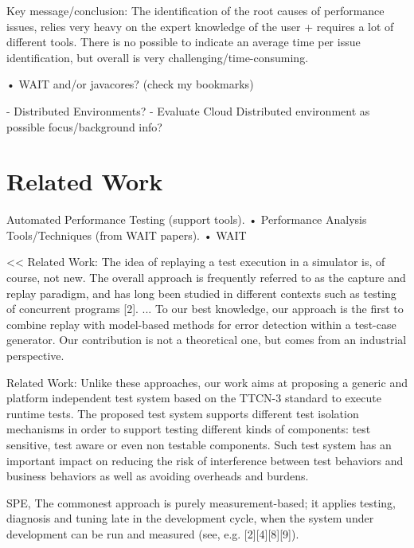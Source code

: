 \documentclass[runningheads,a4paper]{llncs}
\begin{document}
Key message/conclusion: The identification of the root causes of performance issues, relies very heavy on the expert knowledge of the user + requires a lot of different tools. There is no possible to indicate an average time per issue identification, but overall is very challenging/time-consuming.


•	WAIT and/or javacores? (check my bookmarks)

- Distributed Environments? - Evaluate Cloud Distributed environment as possible focus/background info?




\section{Related Work}

Automated Performance Testing (support tools).
•	Performance Analysis Tools/Techniques (from WAIT papers).
•	WAIT

<<
Related Work: The idea of replaying a test execution in a simulator is, of course, not new. The
overall approach is frequently referred to as the capture and replay paradigm,
and has long been studied in different contexts such as testing of concurrent
programs [2]. ... To our best knowledge, our approach is the first to combine replay with model-based
methods for error detection within a test-case generator. Our contribution is not
a theoretical one, but comes from an industrial perspective.

Related Work: Unlike these approaches, our work aims at proposing a generic and platform
independent test system based on the TTCN-3 standard to execute runtime
tests. The proposed test system supports different test isolation mechanisms in
order to support testing different kinds of components: test sensitive, test aware
or even non testable components. Such test system has an important impact on
reducing the risk of interference between test behaviors and business behaviors
as well as avoiding overheads and burdens.

SPE, The commonest approach is purely measurement-based; it
applies testing, diagnosis and tuning late in the development cycle, 
when the system under development can be run and measured (see, e.g.
[2][4][8][9]).
\end{document}
